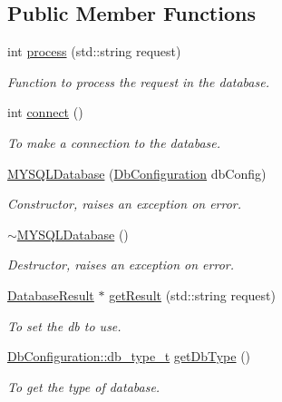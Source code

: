 \subsection*{Public Member Functions}
\begin{DoxyCompactItemize}
\item 
int \hyperlink{classMYSQLDatabase_ae43c4557f43b775f26817082f4913d81}{process} (std::string request)
\begin{DoxyCompactList}\small\item\em Function to process the request in the database. \item\end{DoxyCompactList}\item 
int \hyperlink{classMYSQLDatabase_a3e0dc34a2b20ff76e5fa39cbe340c5d7}{connect} ()
\begin{DoxyCompactList}\small\item\em To make a connection to the database. \item\end{DoxyCompactList}\item 
\hyperlink{classMYSQLDatabase_a69cca4aa62adf08b995908aec1451522}{MYSQLDatabase} (\hyperlink{classDbConfiguration}{DbConfiguration} dbConfig)
\begin{DoxyCompactList}\small\item\em Constructor, raises an exception on error. \item\end{DoxyCompactList}\item 
\hypertarget{classMYSQLDatabase_a5337e67330a1ffa3413a3e9725f1f1c0}{
\hyperlink{classMYSQLDatabase_a5337e67330a1ffa3413a3e9725f1f1c0}{$\sim$MYSQLDatabase} ()}
\label{classMYSQLDatabase_a5337e67330a1ffa3413a3e9725f1f1c0}

\begin{DoxyCompactList}\small\item\em Destructor, raises an exception on error. \item\end{DoxyCompactList}\item 
\hyperlink{classDatabaseResult}{DatabaseResult} $\ast$ \hyperlink{classMYSQLDatabase_a4e3804ff11f44b3e5770932c8351ea92}{getResult} (std::string request)
\begin{DoxyCompactList}\small\item\em To set the db to use. \item\end{DoxyCompactList}\item 
\hyperlink{classDbConfiguration_a4a57e43a5017a5c4833a784a994c91cf}{DbConfiguration::db\_\-type\_\-t} \hyperlink{classMYSQLDatabase_a6002562a486bc8a4c5a820cf45a62e64}{getDbType} ()
\begin{DoxyCompactList}\small\item\em To get the type of database. \item\end{DoxyCompactList}\end{DoxyCompactItemize}
